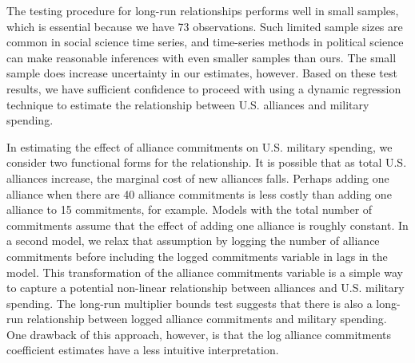 \documentclass[12pt,hidelinks]{article}
\begin{document}
The testing procedure for long-run relationships performs well in small samples,\autocite{Webbetal2019} which is essential because we have 73 observations.
Such limited sample sizes are common in social science time series, and time-series methods in political science can make reasonable inferences with even smaller samples than ours.\autocite[See, for example,][]{OwenQuinn2014}
The small sample does increase uncertainty in our estimates, however. 
Based on these test results, we have sufficient confidence to proceed with using a dynamic regression technique to estimate the relationship between U.S. alliances and military spending. 



In estimating the effect of alliance commitments on U.S. military spending, we consider two functional forms for the relationship. 
It is possible that as total U.S. alliances increase, the marginal cost of new alliances falls.
Perhaps adding one alliance when there are 40 alliance commitments is less costly than adding one alliance to 15 commitments, for example. 
Models with the total number of commitments assume that the effect of adding one alliance is roughly constant. 
In a second model, we relax that assumption by logging the number of alliance commitments before including the logged commitments variable in lags in the model. 
This transformation of the alliance commitments variable is a simple way to capture a potential non-linear relationship between alliances and U.S. military spending. 
The long-run multiplier bounds test suggests that there is also a long-run relationship between logged alliance commitments and military spending. 
One drawback of this approach, however, is that the log alliance commitments coefficient estimates have a less intuitive interpretation. 
\end{document}
